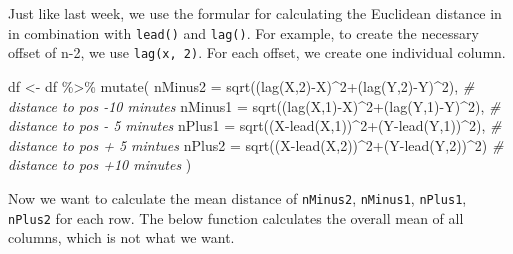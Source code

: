 \documentclass[
]{book}
\newenvironment{Shaded}{\begin{snugshade}}{\end{snugshade}}
\newcommand{\AttributeTok}[1]{\textcolor[rgb]{0.77,0.63,0.00}{#1}}
\newcommand{\CommentTok}[1]{\textcolor[rgb]{0.56,0.35,0.01}{\textit{#1}}}
\newcommand{\DecValTok}[1]{\textcolor[rgb]{0.00,0.00,0.81}{#1}}
\newcommand{\FunctionTok}[1]{\textcolor[rgb]{0.00,0.00,0.00}{#1}}
\newcommand{\NormalTok}[1]{#1}
\newcommand{\OtherTok}[1]{\textcolor[rgb]{0.56,0.35,0.01}{#1}}
\newcommand{\SpecialCharTok}[1]{\textcolor[rgb]{0.00,0.00,0.00}{#1}}
\begin{document}
Just like last week, we use the formular for calculating the Euclidean distance in in combination with \texttt{lead()} and \texttt{lag()}. For example, to create the necessary offset of n-2, we use \texttt{lag(x,\ 2)}. For each offset, we create one individual column.

\begin{Shaded}
\begin{Highlighting}[]

\NormalTok{df }\OtherTok{\textless{}{-}}\NormalTok{ df }\SpecialCharTok{\%\textgreater{}\%}
  \FunctionTok{mutate}\NormalTok{(}
    \AttributeTok{nMinus2 =} \FunctionTok{sqrt}\NormalTok{((}\FunctionTok{lag}\NormalTok{(X,}\DecValTok{2}\NormalTok{)}\SpecialCharTok{{-}}\NormalTok{X)}\SpecialCharTok{\^{}}\DecValTok{2}\SpecialCharTok{+}\NormalTok{(}\FunctionTok{lag}\NormalTok{(Y,}\DecValTok{2}\NormalTok{)}\SpecialCharTok{{-}}\NormalTok{Y)}\SpecialCharTok{\^{}}\DecValTok{2}\NormalTok{),   }\CommentTok{\# distance to pos {-}10 minutes}
    \AttributeTok{nMinus1 =} \FunctionTok{sqrt}\NormalTok{((}\FunctionTok{lag}\NormalTok{(X,}\DecValTok{1}\NormalTok{)}\SpecialCharTok{{-}}\NormalTok{X)}\SpecialCharTok{\^{}}\DecValTok{2}\SpecialCharTok{+}\NormalTok{(}\FunctionTok{lag}\NormalTok{(Y,}\DecValTok{1}\NormalTok{)}\SpecialCharTok{{-}}\NormalTok{Y)}\SpecialCharTok{\^{}}\DecValTok{2}\NormalTok{),   }\CommentTok{\# distance to pos {-} 5 minutes}
    \AttributeTok{nPlus1  =} \FunctionTok{sqrt}\NormalTok{((X}\SpecialCharTok{{-}}\FunctionTok{lead}\NormalTok{(X,}\DecValTok{1}\NormalTok{))}\SpecialCharTok{\^{}}\DecValTok{2}\SpecialCharTok{+}\NormalTok{(Y}\SpecialCharTok{{-}}\FunctionTok{lead}\NormalTok{(Y,}\DecValTok{1}\NormalTok{))}\SpecialCharTok{\^{}}\DecValTok{2}\NormalTok{), }\CommentTok{\# distance to pos + 5 mintues}
    \AttributeTok{nPlus2  =} \FunctionTok{sqrt}\NormalTok{((X}\SpecialCharTok{{-}}\FunctionTok{lead}\NormalTok{(X,}\DecValTok{2}\NormalTok{))}\SpecialCharTok{\^{}}\DecValTok{2}\SpecialCharTok{+}\NormalTok{(Y}\SpecialCharTok{{-}}\FunctionTok{lead}\NormalTok{(Y,}\DecValTok{2}\NormalTok{))}\SpecialCharTok{\^{}}\DecValTok{2}\NormalTok{)  }\CommentTok{\# distance to pos +10 minutes}
\NormalTok{  )}
\end{Highlighting}
\end{Shaded}

Now we want to calculate the mean distance of \texttt{nMinus2}, \texttt{nMinus1}, \texttt{nPlus1}, \texttt{nPlus2} for each row. The below function calculates the overall mean of all columns, which is not what we want.
\end{document}
